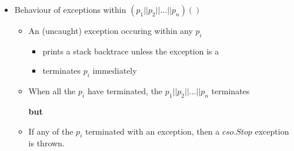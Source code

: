 \documentclass{concdistfoils}
\begin{document}
\begin{slide}
\begin{itemize}
\item Behaviour of exceptions within  $(p_1|| p_2 || ... || p_n)()$
\vfill

\begin{itemize}
\item An (uncaught) exception occuring within any $p_i$
\begin{itemize}
\item prints a stack backtrace unless the exception is a 
\item terminates $p_i$ immediately
\end{itemize}
\vfill
\item When all the $p_i$ have terminated, the  $p_1|| p_2 || ... || p_n$ terminates

\textbf{but}

\item If any of the $p_i$ terminated with an exception, then a $cso.Stop$ exception is thrown.

\end{itemize}
\end{itemize}
\vfill
\end{slide}
\end{document}
